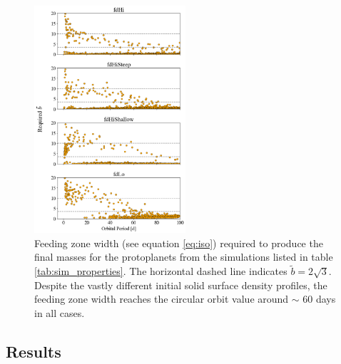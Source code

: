 \documentclass[twocolumn,linenumbers]{aastex63}
\begin{document}
\begin{figure}
\begin{center}
    \includegraphics[width=0.5\textwidth]{figures/surfden_b.png}
    \caption{Feeding zone width (see equation \ref{eq:iso}) required to produce the final masses for the protoplanets from the 
    simulations listed in table \ref{tab:sim_properties}. The horizontal dashed line indicates $\tilde{b} = 2 \sqrt{3}$. Despite the 
    vastly different initial solid surface density profiles, the feeding zone width reaches the circular orbit value around $\sim$ 60 
    days in all cases. \label{fig:surfden_b}}
\end{center}
\end{figure}

\subsection{Results}
\end{document}
